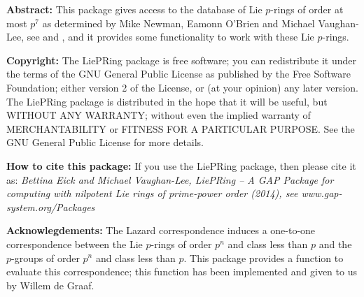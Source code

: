 

{\bf Abstract:}
This package gives access to the database of Lie $p$-rings of order at most 
$p^7$ as determined by Mike Newman, Eamonn O'Brien and Michael Vaughan-Lee, 
see \cite{NOV04} and \cite{OVL05}, and it provides some functionality to 
work with these Lie $p$-rings.
\bigskip

{\bf Copyright:}
The LiePRing package is free software; you can redistribute it under the 
terms of the GNU General Public License as published by the Free Software 
Foundation; either version 2 of the License, or (at your opinion) any 
later version. The LiePRing package is distributed in the hope that it will 
be useful, but WITHOUT ANY WARRANTY; without even the implied warranty of
MERCHANTABILITY or FITNESS FOR A PARTICULAR PURPOSE. See the GNU General 
Public License for more details.
\bigskip

{\bf How to cite this package:}
If you use the LiePRing package, then please cite it as:
{\it Bettina Eick and Michael Vaughan-Lee, LiePRing -- A GAP Package for
computing with nilpotent Lie rings of prime-power order (2014), see
www.gap-system.org/Packages}
\bigskip

{\bf Acknowlegdements:}
The Lazard correspondence induces a one-to-one correspondence between the
Lie $p$-rings of order $p^n$ and class less than $p$ and the $p$-groups of 
order $p^n$ and class less than $p$. This package provides a function to 
evaluate this correspondence; this function has been implemented and given
to us by Willem de Graaf. 

